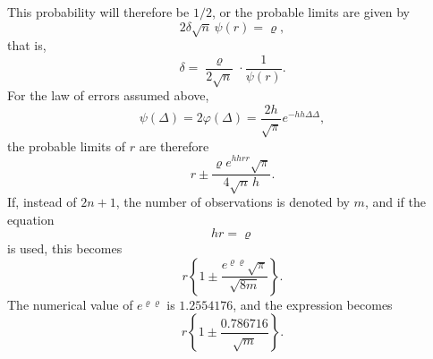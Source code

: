 \documentclass[11pt]{article}
\begin{document}
This probability will therefore be $1/2$, or the probable limits are given by
\[
 2\delta\sqrt n\,\psi(r)=\varrho,
\]
that is,
\[
 \delta=\frac{\varrho}{2\sqrt n}\cdot\frac1{\psi(r)}.
\]
For the law of errors assumed above,
\[
 \psi(\Delta)=2\varphi(\Delta)=\frac{2h}{\sqrt\pi}e^{-hh\Delta\Delta},
\]
the probable limits of $r$ are therefore
\[
 r\pm\frac{\varrho e^{hhr r}\sqrt\pi}{4\sqrt n\,h}.
\]
If, instead of $2n+1$, the number of observations is denoted by $m$, and if the equation
\[
 hr=\varrho
\]
is used, this becomes
\[
 r\left\{1\pm\frac{e^{\varrho\varrho}\sqrt\pi}{\sqrt{8m}}\right\}.
\]
The numerical value of $e^{\varrho\varrho}$ is $1.2554176$, and the expression becomes
\[
 r\left\{1\pm\frac{0.786716}{\sqrt m}\right\}.
\]
\end{document}
